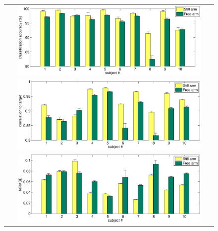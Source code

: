 \documentclass{article}
\begin{document}

\begin{figure}[!ht] \centering
  \begin{tabular}{c}
    \includegraphics[width=0.9\textwidth]{perfClass.eps} \\
    \includegraphics[width=0.9\textwidth]{perfRegr1.eps} \\
    \includegraphics[width=0.9\textwidth]{perfRegr2.eps} \\
  \end{tabular}
\end{figure}
\end{document}
